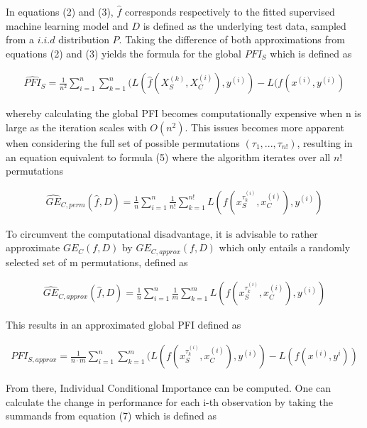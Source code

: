 \documentclass[]{krantz}
\begin{document}
In equations (2) and (3), \(\hat{f}\) corresponds respectively to the
fitted supervised machine learning model and \(D\) is defined as the
underlying test data, sampled from a \(i.i.d\) distribution \(P\).
Taking the difference of both approximations from equations (2) and (3)
yields the formula for the global \(PFI_{S}\) which is defined as

\begin{align}
\widehat{PFI}_{S}  =  \frac{1}{n^{2}}\sum_{i = 1}^{n}\sum_{k = 1}^{n}(L(\hat{f}(X_{S}^{(k)}, X_{C}^{(i)}),  y^{(i)}) - L(f(x^{(i)}, y^{(i)}) \label{eq:eq4}\tag{4}
\end{align}

whereby calculating the global PFI becomes computationally expensive
when n is large as the iteration scales with \(O(n^{2})\). This issues
becomes more apparent when considering the full set of possible
permutations \((\tau_{1}, ..., \tau_{n!})\), resulting in an equation
equivalent to formula (5) where the algorithm iterates over all \(n!\)
permutations

\begin{align}
\widehat{GE}_{C, perm}(\hat{f}, D) = \frac{1}{n}\sum_{i = 1}^{n} \frac{1}{n!}\sum_{k = 1}^{n!}L(f(x_{S}^{\tau_{k}^{(i)}}, x_{C}^{(i)}), y^{(i)}) \label{eq:eq5}\tag{5}
\end{align}

To circumvent the computational disadvantage, it is advisable to rather
approximate \(GE_{C}(f,D)\) by \(GE_{C, approx}(f,D)\) which only
entails a randomly selected set of m permutations, defined as

\begin{align}
\widehat{GE}_{C, approx}(\hat{f}, D) = \frac{1}{n}\sum_{i = 1}^{n} \frac{1}{m}\sum_{k = 1}^{m}L(f(x_{S}^{\tau_{k}^{(i)}}, x_{C}^{(i)}), y^{(i)}) \label{eq:eq6}\tag{6}
\end{align}

This results in an approximated global PFI defined as

\begin{align}
PFI_{S,approx} = \frac{1}{n \cdot m}\sum_{i = 1}^{n}\sum_{k = 1}^{m}(L(f(x_{S}^{\tau_{k}^{(i)}}, x_{C}^{(i)}), y^{(i)}) - L(f(x^{(i)}, y^{i})) \label{eq:eq7}\tag{7}
\end{align}

From there, Individual Conditional Importance can be computed. One can
calculate the change in performance for each i-th observation by taking
the summands from equation (7) which is defined as
\end{document}
